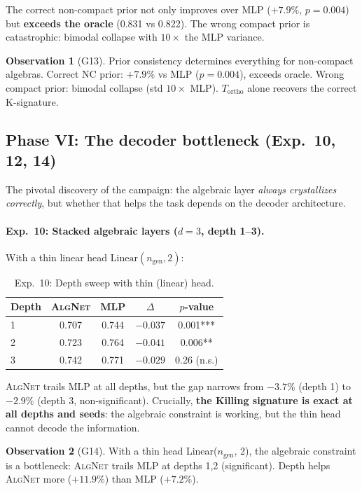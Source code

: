 \documentclass[11pt,a4paper]{article}
\newcommand{\Tortho}{T_{\mathrm{ortho}}}
\newcommand{\ngen}{n_{\mathrm{gen}}}
\newcommand{\AlgNet}{\textsc{AlgNet}}
\theoremstyle{definition}
\newtheorem{observation}{Observation}
\begin{document}
The correct non-compact prior not only improves over MLP 
($+7.9\%$, $p = 0.004$) but \textbf{exceeds the oracle} (0.831 vs 
0.822). The wrong compact prior is catastrophic: bimodal collapse with 
$10\times$ the MLP variance.

\begin{observation}[G13]
Prior consistency determines everything for non-compact algebras. 
Correct NC prior: $+7.9\%$ vs MLP ($p = 0.004$), exceeds oracle. 
Wrong compact prior: bimodal collapse (std $10\times$ MLP). $\Tortho$ 
alone recovers the correct K-signature.
\end{observation}


\subsection{Phase VI: The decoder bottleneck (Exp.~10, 12, 14)}
\label{sec:phase6}

The pivotal discovery of the campaign: the algebraic layer 
\emph{always crystallizes correctly}, but whether that helps the task 
depends on the decoder architecture.

\paragraph{Exp.~10: Stacked algebraic layers ($d = 3$, depth 1--3).}
With a thin linear head $\text{Linear}(\ngen, 2)$:

\begin{table}[H]
\centering
\caption{Exp.~10: Depth sweep with thin (linear) head.}
\label{tab:exp10}
\begin{tabular}{lcccc}
\toprule
Depth & \AlgNet{} & MLP & $\Delta$ & $p$-value \\
\midrule
1 & 0.707 & 0.744 & $-0.037$ & 0.001*** \\
2 & 0.723 & 0.764 & $-0.041$ & 0.006** \\
3 & 0.742 & 0.771 & $-0.029$ & 0.26 (n.s.) \\
\bottomrule
\end{tabular}
\end{table}

\AlgNet{} trails MLP at all depths, but the gap narrows from 
$-3.7\%$ (depth 1) to $-2.9\%$ (depth 3, non-significant). Crucially, 
\textbf{the Killing signature is exact at all depths and seeds}: the 
algebraic constraint is working, but the thin head cannot decode the 
information.

\begin{observation}[G14]
With a thin head Linear($\ngen$, 2), the algebraic constraint is a 
bottleneck: \AlgNet{} trails MLP at depths 1,2 (significant). Depth 
helps \AlgNet{} more ($+11.9\%$) than MLP ($+7.2\%$).
\end{observation}
\end{document}
